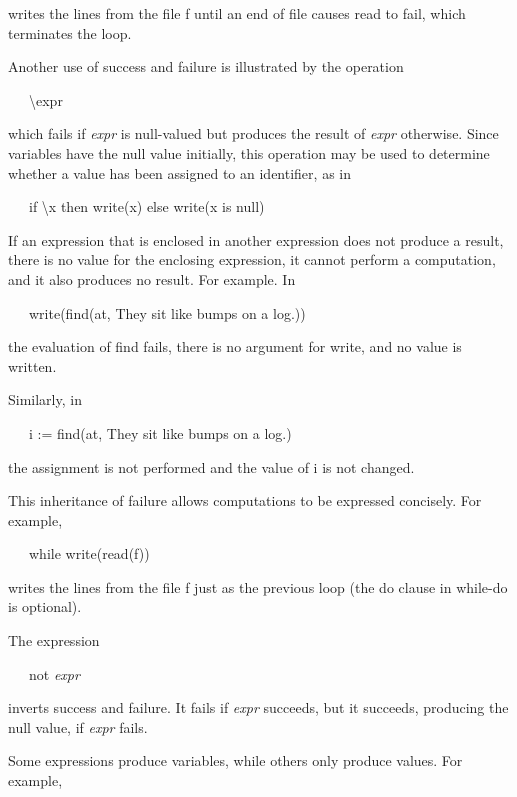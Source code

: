 
\noindent
writes the lines from the file f until an end of file causes read to fail, which terminates the loop.


Another use of success and failure is illustrated by the operation

{\ttfamily\mdseries
\ \ \ {\textbackslash}expr}


which fails if \textit{expr }is null-valued but produces the result of \textit{expr }otherwise. Since variables have the
null value initially, this operation may be used to determine whether a value has been assigned to an identifier, as
in

{\ttfamily\mdseries
\ \ \ if {\textbackslash}x then write(x) else write({\textquotedbl}x is null{\textquotedbl})}


If an expression that is enclosed in another expression does not produce a result, there is no value for the enclosing
expression, it cannot perform a computation, and it also produces no result. For example. In

{\ttfamily\mdseries
\ \ \ write(find({\textquotedbl}at{\textquotedbl}, {\textquotedbl}They sit like bumps on a log.{\textquotedbl}))}

\noindent the evaluation of find fails, there is no argument for write, and no value is written.

Similarly, in

{\ttfamily\mdseries
\ \ \ i := find({\textquotedbl}at{\textquotedbl}, {\textquotedbl}They sit like bumps on a log.{\textquotedbl})}

\noindent the assignment is not performed and the value of i is not changed.


This {\textquotedbl}inheritance{\textquotedbl} of failure allows computations to be expressed concisely. For example,

{\ttfamily\mdseries
\ \ \ while write(read(f))}

\noindent writes the lines from the file f just as the previous loop
(the do clause in while-do is optional).

The expression

{\ttfamily\mdseries
\ \ \ not \textit{expr}}

\noindent inverts success and failure. It fails if \textit{expr}
succeeds, but it succeeds, producing the null value, if \textit{expr}
fails.

Some expressions produce variables, while others only produce
values. For example,

